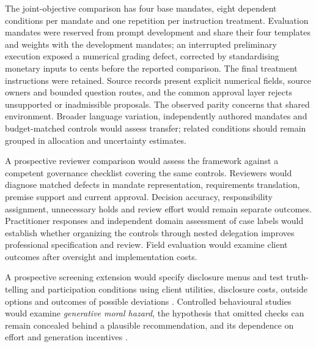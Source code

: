 \documentclass[oneside,10pt,english]{swissi}
\begin{document}
The joint-objective comparison has four base mandates, eight dependent conditions per mandate and one repetition per instruction treatment. Evaluation mandates were reserved from prompt development and share their four templates and weights with the development mandates; an interrupted preliminary execution exposed a numerical grading defect, corrected by standardising monetary inputs to cents before the reported comparison. The final treatment instructions were retained. Source records present explicit numerical fields, source owners and bounded question routes, and the common approval layer rejects unsupported or inadmissible proposals. The observed parity concerns that shared environment. Broader language variation, independently authored mandates and budget-matched controls would assess transfer; related conditions should remain grouped in allocation and uncertainty estimates.

A prospective reviewer comparison would assess the framework against a competent governance checklist covering the same controls. Reviewers would diagnose matched defects in mandate representation, requirements translation, premise support and current approval. Decision accuracy, responsibility assignment, unnecessary holds and review effort would remain separate outcomes. Practitioner responses and independent domain assessment of case labels would establish whether organizing the controls through nested delegation improves professional specification and review. Field evaluation would examine client outcomes after oversight and implementation costs.

A prospective screening extension would specify disclosure menus and test truth-telling and participation conditions using client utilities, disclosure costs, outside options and outcomes of possible deviations \parencite{rothschildstiglitz1976,mirrlees1976incentives}. Controlled behavioural studies would examine \emph{generative moral hazard}, the hypothesis that omitted checks can remain concealed behind a plausible recommendation, and its dependence on effort and generation incentives \parencite{holmstrom1979moral,kalai2025hallucinate}.

\printbibliography

\swDeclarationsPage
\end{document}
